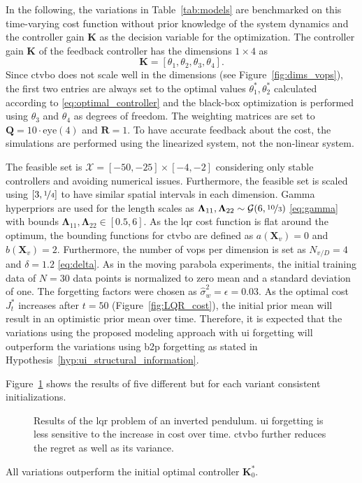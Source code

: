 In the following, the variations in Table~\ref{tab:models} are benchmarked on this time-varying cost function without prior knowledge of the system dynamics and the controller gain $\mathbf{K}$ as the decision variable for the optimization. The controller gain $\mathbf{K}$ of the feedback controller has the dimensions $1\times4$ as 
\begin{equation}
    \mathbf{K} = [\theta_1,\theta_2,\theta_3,\theta_4].
\end{equation}
Since \gls{ctvbo} does not scale well in the dimensions (see Figure~\ref{fig:dims_vops}), the first two entries are always set to the optimal values $\theta_1^*,\theta_2^*$ calculated according to \eqref{eq:optimal_controller} and the black-box optimization is performed using $\theta_3$ and $\theta_4$ as degrees of freedom. The weighting matrices are set to $\mathbf{Q}=10\cdot\text{eye}(4)$ and $\mathbf{R} = 1$. To have accurate feedback about the cost, the simulations are performed using the linearized system, not the non-linear system. 

The feasible set is $\mathcal{X}=[-50, -25]\times[-4, -2]$ considering only stable controllers and avoiding numerical issues. Furthermore, the feasible set is scaled using $[3, \nicefrac{1}{4}]$ to have similar spatial intervals in each dimension. Gamma hyperpriors are used for the length scales as $\boldsymbol\Lambda_{11}, \boldsymbol\Lambda_{22} \sim \mathcal{G}(6, \nicefrac{10}{3})$ \eqref{eq:gamma} with bounds $\boldsymbol\Lambda_{11},\boldsymbol\Lambda_{22} \in [0.5, 6]$. As the \gls{lqr} cost function is flat around the optimum, the  bounding functions for \gls{ctvbo} are defined as $a(\mathbf{X}_v)=0$ and $b(\mathbf{X}_v)=2$. Furthermore, the number of \glspl{vop} per dimension is set as $N_{v/D} = 4$ and $\delta =1.2$ \eqref{eq:delta}. As in the moving parabola experiments, the initial training data of $N=30$ data points is normalized to zero mean and a standard deviation of one. The forgetting factors were chosen as $\hat{\sigma}_w^2 = \epsilon = 0.03$. As the optimal cost $J_t^*$ increases after $t=50$ (Figure~\ref{fig:LQR_cost}), the initial prior mean will result in an optimistic prior mean over time.
Therefore, it is expected that the variations using the proposed modeling approach with \gls{ui} forgetting will outperform the variations using \gls{b2p} forgetting as stated in Hypothesis~\ref{hyp:ui_structural_information}.

Figure~\ref{fig:LQR_cumulative_regret} shows the results of five different but for each variant consistent initializations.
\begin{figure}[h]
    \centering
    
    \caption[Results of the \gls{lqr} problem of an inverted pendulum.]{Results of the \gls{lqr} problem of an inverted pendulum. \gls{ui} forgetting is less sensitive to the increase in cost over time. \gls{ctvbo} further reduces the regret as well as its variance.}
    \label{fig:LQR_cumulative_regret}
\end{figure}
All variations outperform the initial optimal controller $\mathbf{K}_0^*$. 

